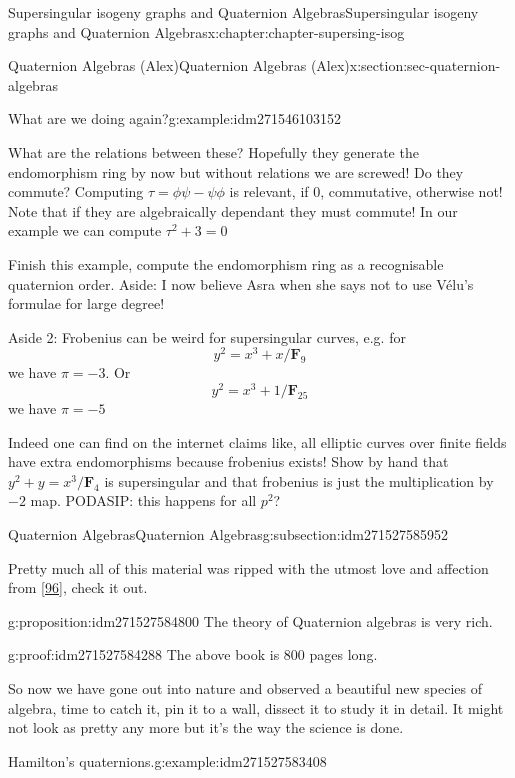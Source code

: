 \documentclass[oneside,10pt,]{book}
\numberwithin{equation}{section}
\newcommand{\FF}{\mathbf{F}}
\begin{document}
\begin{chapterptx}{Supersingular isogeny graphs and Quaternion Algebras}{}{Supersingular isogeny graphs and Quaternion Algebras}{}{}{x:chapter:chapter-supersing-isog}
\begin{sectionptx}{Quaternion Algebras (Alex)}{}{Quaternion Algebras (Alex)}{}{}{x:section:sec-quaternion-algebras}
\begin{introduction}{}
\begin{example}{What are we doing again?}{g:example:idm271546103152}
\par
What are the relations between these? Hopefully they generate the endomorphism ring by now but without relations we are screwed! Do they commute? Computing \(\tau = \phi \psi  - \psi \phi\) is relevant, if 0, commutative, otherwise not! Note that if they are algebraically dependant they must commute! In our example we can compute \(\tau^2 + 3 = 0\)%
\end{example}
Finish this example, compute the endomorphism ring as a recognisable quaternion order.%
Aside: I now believe Asra when she says not to use Vélu's formulae for large degree!%
\par
Aside 2: Frobenius can be weird for supersingular curves, e.g. for%
\begin{equation*}
y^2 = x^{3} + x/\FF_9
\end{equation*}
we have \(\pi = -3\). Or%
\begin{equation*}
y^2 = x^{3} + 1/\FF_{25}
\end{equation*}
we have \(\pi = -5\)%
\par
Indeed one can find on the internet claims like, all elliptic curves over finite fields have extra endomorphisms because frobenius exists!%
Show by hand that \(y^2 + y = x^3/\FF_4\) is supersingular and that frobenius is just the multiplication by \(-2\) map.%
PODASIP: this happens for all \(p^2\)?%
\end{introduction}%
%
%
\typeout{************************************************}
\typeout{************************************************}
%
\begin{subsectionptx}{Quaternion Algebras}{}{Quaternion Algebras}{}{}{g:subsection:idm271527585952}
\begin{introduction}{}%
Pretty much all of this material was ripped with the utmost love and affection from \hyperlink{x:biblio:bib-voight-quat}{[96]}, check it out.%
\begin{proposition}{}{}{g:proposition:idm271527584800}%
The theory of Quaternion algebras is very rich.%
\end{proposition}
\begin{proofptx}{}{g:proof:idm271527584288}
The above book is 800 pages long.%
\end{proofptx}
So now we have gone out into nature and observed a beautiful new species of algebra, time to catch it, pin it to a wall, dissect it to study it in detail. It might not look as pretty any more but it's the way the science is done.%
\begin{example}{Hamilton's quaternions.}{g:example:idm271527583408}%

\end{example}
\end{introduction}
\end{subsectionptx}
\end{sectionptx}
\end{chapterptx}
\end{document}

